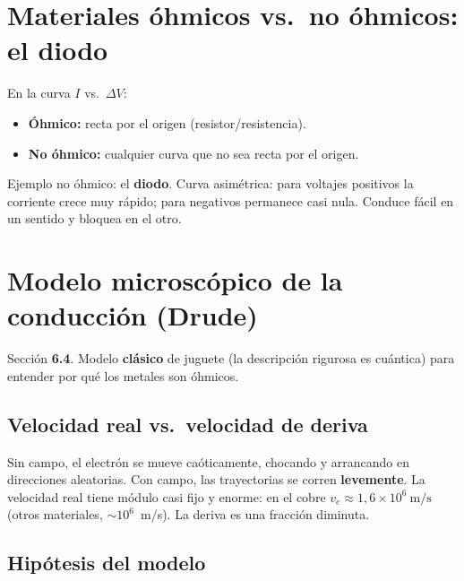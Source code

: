 \documentclass[12pt,a4paper]{article}
\begin{document}


\section{Materiales óhmicos vs.\ no óhmicos: el diodo}

En la curva $I$ vs.\ $\Delta V$:
\begin{itemize}[nosep]
  \item \textbf{Óhmico:} recta por el origen (resistor/resistencia).
  \item \textbf{No óhmico:} cualquier curva que no sea recta por el
        origen.
\end{itemize}

Ejemplo no óhmico: el \textbf{diodo}. Curva asimétrica: para voltajes
positivos la corriente crece muy rápido; para negativos permanece casi
nula. Conduce fácil en un sentido y bloquea en el otro.



\section{Modelo microscópico de la conducción (Drude)}

Sección \textbf{6.4}. Modelo \textbf{clásico} de juguete (la descripción
rigurosa es cuántica) para entender por qué los metales son óhmicos.

\subsection{Velocidad real vs.\ velocidad de deriva}

Sin campo, el electrón se mueve caóticamente, chocando y arrancando en
direcciones aleatorias. Con campo, las trayectorias se corren
\textbf{levemente}. La velocidad real tiene módulo casi fijo y enorme: en
el cobre $v_e \approx 1{,}6\times10^{6}\ \text{m/s}$ (otros materiales,
$\sim 10^{6}$~m/s). La deriva es una fracción diminuta.

\subsection{Hipótesis del modelo}
\end{document}
